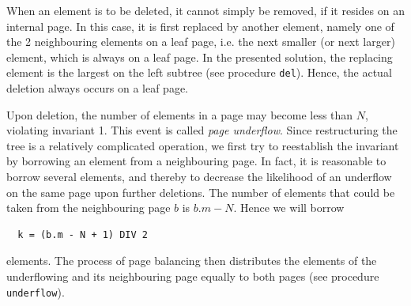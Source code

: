 When an element is to be deleted, it cannot simply be removed, if it resides on an internal page.
In this case, it is first replaced by another element, namely one of the 2 neighbouring elements
on a leaf page, i.e. the next smaller (or next larger) element, which is always on a leaf page. In
the presented solution, the replacing element is the largest on the left subtree (see procedure
\verb|del|). Hence, the actual deletion always occurs on a leaf page.

Upon deletion, the number of elements in a page may become less than $N$, violating invariant 1.
This event is called \emph{page underflow}. Since restructuring the tree is a relatively complicated
operation, we first try to reestablish the invariant by borrowing an element from a neighbouring
page. In fact, it is reasonable to borrow several elements, and thereby to decrease the likelihood
of an underflow on the same page upon further deletions. The number of elements that could be
taken from the neighbouring page $b$ is $b.m - N$. Hence we will borrow
\begin{verbatim}
  k = (b.m - N + 1) DIV 2
\end{verbatim}
elements. The process of page balancing then distributes the elements of the underflowing and its
neighbouring page equally to both pages (see procedure \verb|underflow|).

